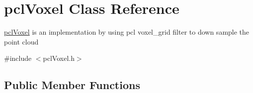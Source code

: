 \hypertarget{classpclVoxel}{}\section{pcl\+Voxel Class Reference}
\label{classpclVoxel}


\hyperlink{classpclVoxel}{pcl\+Voxel} is an implementation by using pcl voxel\+\_\+grid filter to down sample the point cloud
\begin{DoxyItemize}
\item 
\end{DoxyItemize} 




{\ttfamily \#include $<$pcl\+Voxel.\+h$>$}

\subsection*{Public Member Functions}
